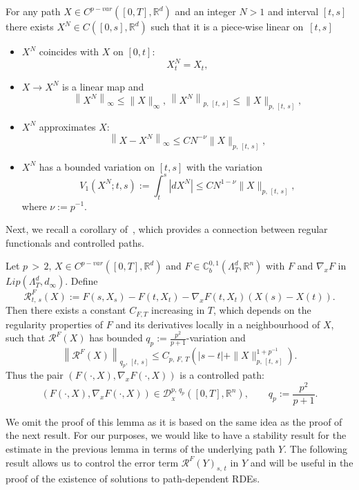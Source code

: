 \documentclass[AHL,Unicode,longabstracts,published]{cedram}
\newcommand{\bbC}{\mathbb{C}}
\newcommand{\calD}{\mathcal{D}}
\newcommand{\calR}{\mathcal{R}}
\newcommand{\Rr}{{\mathbb{R}}}
\begin{document}
\begin{lemm}\label{chp2ilem:approxomega}
For any path $ X\in C^{p-var}([0,T],\Rr^d)$ and an integer $N>1$ and interval $[t,s]$ there exists $ X^N\in C([0,s], \Rr^d)$ such that it is a piece-wise linear on~$[t,s]$
\begin{itemize}
\item $ X^N$ coincides with $ X$ on $[0,t]:$
\[
X^N_t= X_t,
\]
\item $X\to X^N$ is a linear map and
\[
\left\|X^N\right\|_{\infty}\leq \|X\|_{\infty},\, \left\|X^N\right\|_{p,\,[t,\,s]}\leq \|X\|_{p,\,[t,\,s]},
\]
\item $ X^N$ approximates $X$:
\[
\left\| X-X^N\right\|_{\infty}\leq C N^{-\nu}\|X\|_{p,\, [t,\,s]},
\]

\item $ X^N$ has a bounded variation on $[t,s]$ with the variation
\[
V_1\left(X^N; t, s\right):= \int_t^s \left|dX^N\right|\leq C N^{1-\nu}\|X\|_{p,\,[t,\,s]},
\]
where $\nu:= p^{-1}.$
\end{itemize}
\end{lemm}

Next, we recall a corollary of~\cite[Theorem~5.12]{Anna}, which provides a connection between regular functionals and controlled paths.

\begin{lemm}\label{chp3theorem:controll}
Let ${p\,>\,2},\, X\in C^{p-var}([0,T],\Rr^d)$ and $F\in \bbC^{0,1}_b(\Lambda^d_T,\Rr^n)$ with $F$ and $\nabla_{{x}} F$ in $Lip(\Lambda^d_T, d_{\infty})$.
Define
\begin{equation}\label{chp2ieq:controlledpath}
\calR^{F}_{t,\,s}(X):=F\left(s, X_s\right)-F\left(t, X_t\right)-\nabla_{x}F\left(t, X_{t}\right)\left(X(s)- X(t)\right).
\end{equation}
Then there exists a constant $C_{F,T}$ increasing in $T$, which depends on the regularity properties of $F$ and its derivatives locally in a neighbourhood of $X$, such that ${\calR}^{F}(X)$ has bounded $q_p:=\frac {p^2} {p+1}$-variation and
\[
\left\|{\calR}^{F}(X)\right\|_{q_p,\,[t,\,s]}\leq C_{p,\,F,\, T}\left(|s-t|+\| X\|_{p, \,[t,\,s]}^{1+p^{-1}}\right).
\]
Thus the pair $(F(\cdot, X), \nabla_{{x}} F(\cdot, X))$ is a controlled path:
\[
\left(F(\cdot, X), \nabla_{{x}} F(\cdot, X)\right)\in \calD^{p,\,q_p}_{_X}\left([0,T], {\Rr^n}\right),\qquad q_p:=\frac {p^2} {p+1}.
\]
\end{lemm}

We omit the proof of this lemma as it is based on the same idea as the proof of the next result. For our purposes, we would like to have a stability result for the estimate in the previous lemma in terms of the underlying path $Y.$ The following result allows us to control the error term $\calR^{F}(Y)_{s,\,t}$ in $Y$ and will be useful in the proof of the existence of solutions to path-dependent RDEs.
\end{document}
